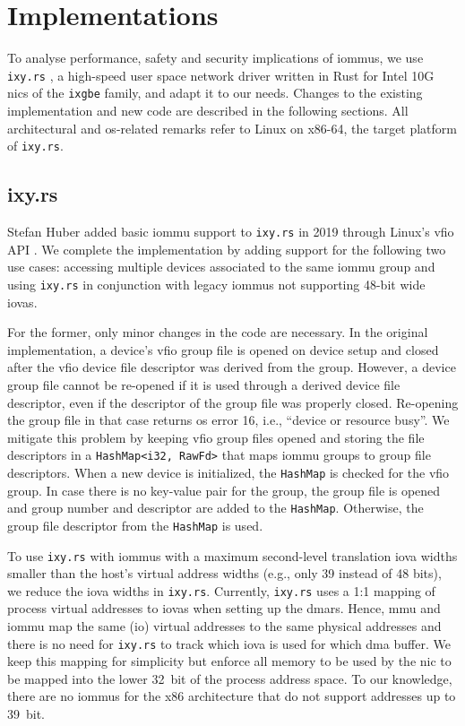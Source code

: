 \chapter{Implementations}
\label{chap:implementations}

To analyse performance, safety and security implications of \acp{iommu}, we use
\texttt{ixy.rs} \cite{ellmann2018writing}, a high-speed user space network
driver written in Rust for Intel 10G \acp{nic} of the \texttt{ixgbe} family, and
adapt it to our needs. Changes to the existing implementation and new code are
described in the following sections. All architectural and \ac{os}-related
remarks refer to Linux on x86-64, the target platform of \texttt{ixy.rs}.


\section{ixy.rs}
\label{sec:ixy_rs}

Stefan Huber added basic \ac{iommu} support to \texttt{ixy.rs} in 2019 through
Linux's \ac{vfio} API \cite{huber2019using}. We complete the implementation by
adding support for the following two use cases: accessing multiple devices
associated to the same \ac{iommu} group and using \texttt{ixy.rs} in conjunction
with legacy \acp{iommu} not supporting 48-bit wide \acp{iova}.

For the former, only minor changes in the code are necessary. In the original
implementation, a device's \ac{vfio} group file is opened on device setup and
closed after the \ac{vfio} device file descriptor was derived from the group.
However, a device group file cannot be re-opened if it is used through a derived
device file descriptor, even if the descriptor of the group file was properly
closed. Re-opening the group file in that case returns \ac{os} error 16, i.e.,
``device or resource busy''. We mitigate this problem by keeping \ac{vfio} group
files opened and storing the file descriptors in a \texttt{HashMap<i32, RawFd>}
that maps \ac{iommu} groups to group file descriptors. When a new device is
initialized, the \texttt{HashMap} is checked for the \ac{vfio} group. In case
there is no key-value pair for the group, the group file is opened and group
number and descriptor are added to the \texttt{HashMap}. Otherwise, the group
file descriptor from the \texttt{HashMap} is used.

To use \texttt{ixy.rs} with \acp{iommu} with a maximum second-level translation
\ac{iova} widths smaller than the host's virtual address widths (e.g., only 39
instead of 48 bits), we reduce the \ac{iova} widths in \texttt{ixy.rs}.
Currently, \texttt{ixy.rs} uses a 1:1 mapping of process virtual addresses to
\acp{iova} when setting up the \acp{dmar}. Hence, \ac{mmu} and \ac{iommu} map
the same (\ac{io}) virtual addresses to the same physical addresses and there is
no need for \texttt{ixy.rs} to track which \ac{iova} is used for which \ac{dma}
buffer. We keep this mapping for simplicity but enforce all memory to be used by
the \ac{nic} to be mapped into the lower 32~bit of the process address space.
To our knowledge, there are no \acp{iommu} for the x86 architecture that do not
support addresses up to 39~bit.

